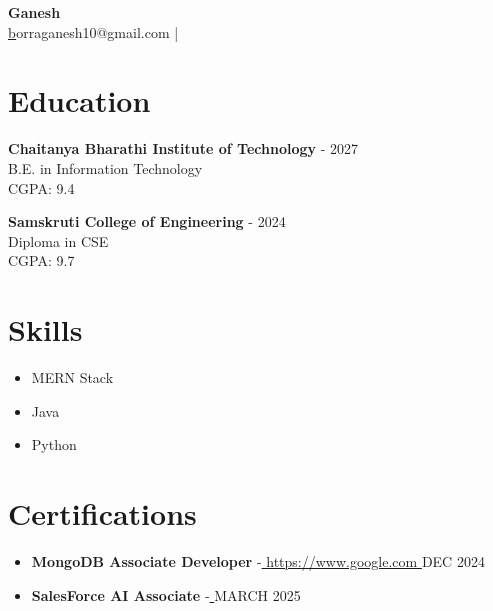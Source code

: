 \documentclass[a4paper,10pt]{article}
\begin{document}
\pagestyle{empty}

\begin{center}
    {\LARGE \textbf{ Ganesh }}\\
    \href{mailto: borraganesh10@gmail.com }borraganesh10@gmail.com \quad |  \\
\end{center}

\section*{Education}

    \textbf{ Chaitanya Bharathi Institute of Technology }  - 2027 \\
    {  } B.E. in Information Technology \\
    {  }  CGPA: 9.4

    \textbf{ Samskruti College of Engineering  }  - 2024 \\
    {  } Diploma in CSE \\
    {  }  CGPA: 9.7



\section*{Skills}
\begin{itemize}[leftmargin=*]
  
    \item MERN Stack 
  
    \item Java 
  
    \item Python
  
\end{itemize}



\section*{Certifications}
\begin{itemize}[leftmargin=*]
  
    \item \textbf{ MongoDB Associate Developer } {-}\href{ https://www.google.com }{ https://www.google.com } \hfill{ DEC 2024 }
  
    \item \textbf{ SalesForce AI Associate } {-}\href{  }{  } \hfill{ MARCH 2025 }
  
\end{itemize}
\end{document}
